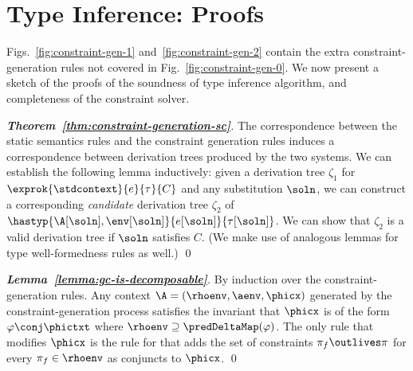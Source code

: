 \section{Type Inference: Proofs}

Figs.~\ref{fig:constraint-gen-1} and~\ref{fig:constraint-gen-2} contain the
extra constraint-generation rules not covered in Fig.~\ref{fig:constraint-gen-0}.
We now present a sketch of the proofs of the soundness of type
inference algorithm, and completeness of the constraint solver.


\begin{proof}[\textbf{Theorem~\ref{thm:constraint-generation-sc}}]
The correspondence between the static semantics rules and the constraint generation
rules induces a correspondence between derivation trees produced by the
two systems.
We can establish the following lemma inductively:
given a derivation tree $\zeta_1$ for
$\exprok {\stdcontext}{e}{\tau}{C}$
and any substitution $\soln$,
we can construct a corresponding \emph{candidate} derivation
tree $\zeta_2$ of $\hastyp {\A[\soln],\env[\soln]}{e[\soln]}{\tau[\soln]}$.
We can show that $\zeta_2$ is a valid derivation tree if $\soln$ satisfies $C$.
(We make use of analogous lemmas for type well-formedness rules as well.)
\qed
\end{proof}


\begin{proof}[\textbf{Lemma~\ref{lemma:gc-is-decomposable}}]
  By induction over the constraint-generation rules.
  Any context $\A = (\rhoenv,\aenv,\phicx)$ generated by the constraint-generation
  process satisfies the invariant that $\phicx$ is of the form $\varphi \conj \phictxt$
  where $\rhoenv \supseteq \predDeltaMap(\varphi)$.
  The only rule that modifies $\phicx$ is the rule for 
  that adds the set of constraints $\pi_f \outlives \pi$ for every $\pi_f \in \rhoenv$
  as conjuncts to $\phicx$.
\qed
\end{proof}

